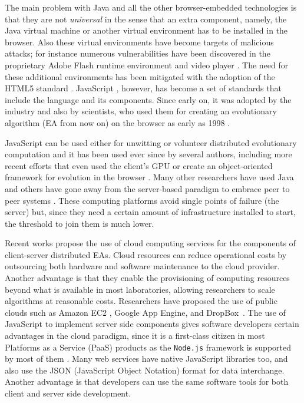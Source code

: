 \documentclass[journal,onecolumn]{IEEEtran}
\begin{document}
The main problem with Java and all the other browser-embedded
technologies is that they are not {\em universal} in the
sense that an extra component, namely, the Java virtual machine or another
virtual environment has to be installed in the browser.
Also these virtual environments have become targets of malicious attacks; 
for instance numerous vulnerabilities have been discovered in 
the proprietary Adobe Flash runtime environment and
video player \cite{ford2009analyzing,watanabe2010new}. The need for
these additional environments has been mitigated with the
adoption of the HTML5 standard \cite{anthes2012html5}.
JavaScript \cite{flanagan2006javascript}, however, has become a set of standards
\cite{ECMA-262} that include the language and its components. Since
early on, it was adopted by the industry and also by scientists,
who used them for creating an evolutionary algorithm (EA from now on) on
the browser as early as 1998 \cite{jj-ppsn98}.

JavaScript can be used either for unwitting
\cite{unwitting-ec} or volunteer 
\cite{langdon:2005:metas,gecco07:workshop:dcor} distributed
evolutionary computation and it has been used ever since by several
authors, including more recent efforts
\cite{Desell:2008:AHG:1389095.1389273,duda2013distributed,DBLP:journals/corr/abs-0801-1210} 
that even
used the client's GPU \cite{duda2013gpu} or create an object-oriented
framework for evolution in the browser \cite{EvoStar2014:jsEO}. Many other researchers have
used Java \cite{chong:1999:jDGPi} and others have gone away from the
server-based paradigm to embrace peer to peer systems
\cite{jin2006constructing,10.1109/ICICSE.2008.99,DBLP:conf/3pgcic/GuervosMFEL12}. These computing
platforms avoid single points of failure (the server) but, since they
need a certain amount of infrastructure installed to start, the
threshold to join them is much lower. %

Recent works propose the use of cloud computing services for the components of
client-server distributed EAs. Cloud resources
can reduce operational costs by outsourcing both hardware and software maintenance
to the cloud provider. Another advantage is that they enable the provisioning of computing resources beyond what
is available in most laboratories, allowing researchers to
scale algorithms at reasonable costs. Researchers have proposed the use of
public clouds such as Amazon EC2 \cite{CloudScale}, Google App Engine\cite{di2013towards},
and DropBox~\cite{mericloud}. The use of JavaScript to implement
server side components
gives software developers certain advantages in the cloud
paradigm, since it is a first-class citizen
in most Platforms as a Service (PaaS) products as the {\tt Node.js} framework is supported by most of them \cite{wood13:nodejs:paas}. Many web services
have native JavaScript libraries too, and also use the JSON (JavaScript Object Notation) format for data interchange. Another advantage is that
developers can use the same software tools for both client and server
side development.
\end{document}
